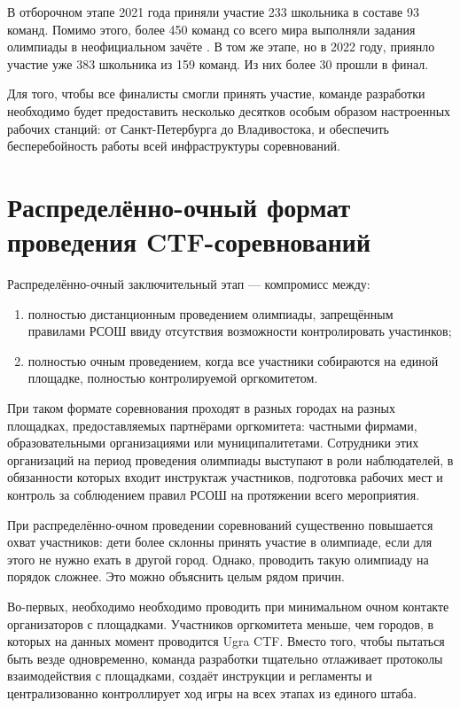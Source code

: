 В отборочном этапе 2021 года приняли участие 233 школьника в составе 93 команд. Помимо этого, более 450 команд со всего мира выполняли задания олимпиады в неофициальном зачёте \cite{Ugra21}. В том же этапе, но в 2022 году, приянло участие уже 383 школьника из 159 команд. Из них более 30 прошли в финал.

Для того, чтобы все финалисты смогли принять участие, команде разработки необходимо будет предоставить несколько десятков особым образом настроенных рабочих станций: от Санкт-Петербурга до Владивостока, и обеспечить бесперебойность работы всей инфраструктуры соревнований.


\section{Распределённо-очный формат проведения CTF-соревнований}
\label{cha:analysis:}


Распределённо-очный заключительный этап --- компромисс между:
\begin{enumerate}
  \item полностью дистанционным проведением олимпиады, запрещённым правилами РСОШ ввиду отсутствия возможности контролировать участинков;
  \item полностью очным проведением, когда все участники собираются на единой площадке, полностью контролируемой оргкомитетом.
\end{enumerate}

При таком формате соревнования проходят в разных городах на разных площадках, предоставляемых партнёрами оргкомитета: частными фирмами, образовательными организациями или муниципалитетами.
Сотрудники этих организаций на период проведения олимпиады выступают в роли наблюдателей, в обязанности которых входит инструктаж участников, подготовка рабочих мест и контроль за соблюдением правил РСОШ на протяжении всего мероприятия.

При распределённо-очном проведении соревнований существенно повышается охват участников: дети более склонны принять участие в олимпиаде, если для этого не нужно ехать в другой город. Однако, проводить такую олимпиаду на порядок сложнее. Это можно объяснить целым рядом причин.

Во-первых, необходимо необходимо проводить при минимальном очном контакте организаторов с площадками. Участников оргкомитета меньше, чем городов, в которых на данных момент проводится Ugra CTF. Вместо того, чтобы пытаться быть везде одновременно, команда разработки тщательно отлаживает протоколы взаимодействия с площадками, создаёт инструкции и регламенты и централизованно контроллирует ход игры на всех этапах из единого штаба.

